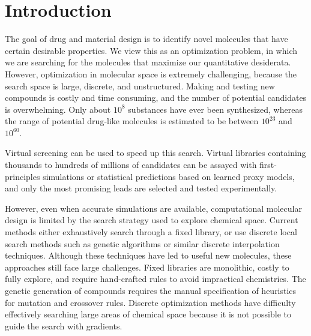 \section{Introduction}

The goal of drug and material design is to identify novel molecules that have certain desirable properties.  We view this as an optimization problem, in which we are searching for the molecules that maximize our quantitative desiderata.
However, optimization in molecular space is extremely challenging, because the search space is large, discrete, and unstructured.
Making and testing new compounds is costly and time consuming, and the number of potential candidates is overwhelming. Only about $10^8$ substances have ever been synthesized, \cite{Kim2016} whereas the range of potential drug-like molecules is estimated to be between $10^{23}$ and $10^{60}$\cite{polischuk2013}.

Virtual screening can be used to speed up this search.\cite{shoichet_2004_virtual,scior2012,cheng2012,Pyzer_Knapp_2015} Virtual libraries containing thousands to hundreds of millions of candidates can be assayed with first-principles simulations or statistical predictions based on learned proxy models, and only the most promising leads are selected and tested experimentally.

However, even when accurate simulations are available,\cite{schneider_2010_virtual} computational molecular design is limited by the search strategy used to explore chemical space.
Current methods either exhaustively search through a fixed library,\cite{hachmann2011harvard,bombarelli2016} or use discrete local search methods such as genetic algorithms\cite{Virshup_2013, Rupakheti_2015, Reymond_2015, Reymond_2010,kanal_2013_efficient,oboyle_2011_computational} or similar discrete interpolation techniques.\cite{van_Deursen_2007,wang2006designing,balamurugan2008exploring}
Although these techniques have led to useful new molecules, these approaches still face large challenges. Fixed libraries are monolithic, costly to fully explore, and require hand-crafted rules to avoid impractical chemistries. The genetic generation of compounds requires the manual specification of heuristics for mutation and crossover rules. Discrete optimization methods have difficulty effectively searching large areas of chemical space because it is not possible to guide the search with gradients.

